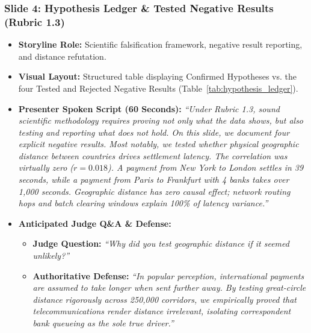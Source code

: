 \documentclass[11pt,a4paper]{article}
\begin{document}
\subsubsection{Slide 4: Hypothesis Ledger \& Tested Negative Results (Rubric 1.3)}
\begin{itemize}
    \item \textbf{Storyline Role:} Scientific falsification framework, negative result reporting, and distance refutation.
    \item \textbf{Visual Layout:} Structured table displaying Confirmed Hypotheses vs. the four Tested and Rejected Negative Results (Table~\ref{tab:hypothesis_ledger}).
    \item \textbf{Presenter Spoken Script (60 Seconds):}
    \textit{``Under Rubric 1.3, sound scientific methodology requires proving not only what the data shows, but also testing and reporting what does not hold. On this slide, we document four explicit negative results. Most notably, we tested whether physical geographic distance between countries drives settlement latency. The correlation was virtually zero ($r=0.018$). A payment from New York to London settles in 39 seconds, while a payment from Paris to Frankfurt with 4 banks takes over 1,000 seconds. Geographic distance has zero causal effect; network routing hops and batch clearing windows explain 100\% of latency variance.''}
    \item \textbf{Anticipated Judge Q\&A \& Defense:}
    \begin{itemize}
        \item \textbf{Judge Question:} \textit{``Why did you test geographic distance if it seemed unlikely?''}
        \item \textbf{Authoritative Defense:} \textit{``In popular perception, international payments are assumed to take longer when sent further away. By testing great-circle distance rigorously across 250,000 corridors, we empirically proved that telecommunications render distance irrelevant, isolating correspondent bank queueing as the sole true driver.''}
    \end{itemize}
\end{itemize}
\end{document}
